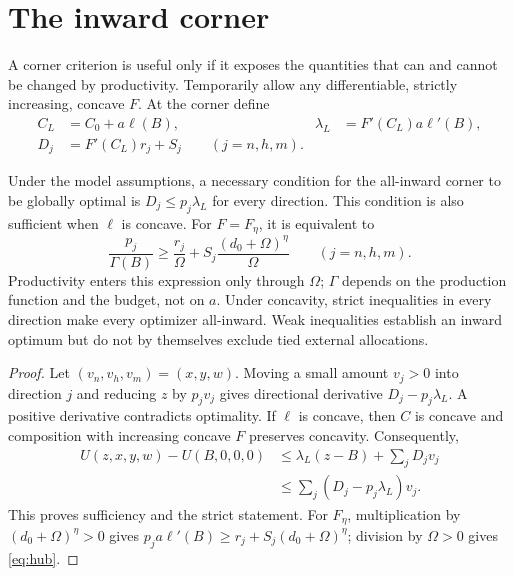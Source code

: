 \section{The inward corner}
\label{sec:inward}
\label{sec:threshold}

A corner criterion is useful only if it exposes the quantities that can
and cannot be changed by productivity. Temporarily allow any
differentiable, strictly increasing, concave $F$. At the corner define
\begin{align}
 C_L&=C_0+a\ell(B),&
 \lambda_L&=F'(C_L)a\ell'(B),\label{eq:local-return}\\
 D_j&=F'(C_L)r_j+S_j\qquad(j=n,h,m).
 \label{eq:external-return}
\end{align}

\begin{proposition}
\label{prop:hub}
Under the model assumptions, a necessary condition for the all-inward
corner to be globally optimal is
$D_j\leq p_j\lambda_L$ for every direction. This condition is also
sufficient when $\ell$ is concave. For $F=F_\eta$, it is equivalent to
\begin{equation}
 \boxed{\frac{p_j}{\Gamma(B)}\geq
 \frac{r_j}{\Omega}
 +S_j\frac{(d_0+\Omega)^\eta}{\Omega}}
 \qquad(j=n,h,m).
 \label{eq:hub}
\end{equation}
Productivity enters this expression only through $\Omega$; $\Gamma$
depends on the production function and the budget, not on $a$.
Under concavity, strict inequalities in every direction make every
optimizer all-inward. Weak inequalities establish an inward optimum
but do not by themselves exclude tied external allocations.
\end{proposition}
\begin{proof}
Let $(v_n,v_h,v_m)=(x,y,w)$. Moving a small amount $v_j>0$ into direction
$j$ and reducing $z$ by $p_jv_j$ gives directional derivative
$D_j-p_j\lambda_L$. A positive derivative contradicts optimality.
If $\ell$ is concave, then $C$ is concave and composition with increasing
concave $F$ preserves concavity. Consequently,
\begin{align}
 U(z,x,y,w)-U(B,0,0,0)
 &\leq\lambda_L(z-B)+\sum_jD_jv_j\nonumber\\
 &\leq\sum_j(D_j-p_j\lambda_L)v_j.
 \label{eq:cornerproof}
\end{align}
This proves sufficiency and the strict statement. For $F_\eta$,
multiplication by $(d_0+\Omega)^\eta>0$ gives
$p_ja\ell'(B)\geq r_j+S_j(d_0+\Omega)^\eta$; division by
$\Omega>0$ gives \cref{eq:hub}.
\end{proof}

